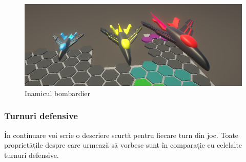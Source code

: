 \documentclass[12pt, a4paper]{article}
\begin{document}
	\begin{figure}[H]
		\centering
		\includegraphics[width=1\textwidth]{Ambusher.png}
		\caption{Inamicul bombardier}
		\label{fig: enemyAmbusher}
	\end{figure}
	
	
	
	\subsubsection{Turnuri defensive}
	În continuare voi scrie o descriere scurtă pentru fiecare turn din joc. Toate proprietățile despre care urmează să vorbesc sunt în comparație cu celelalte turnuri defensive.
\end{document}
